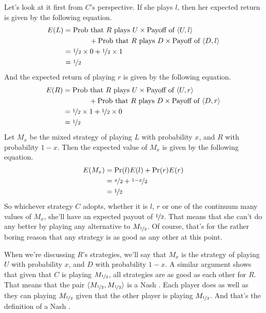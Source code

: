 Let's look at it first from $C$'s perspective. If she plays $l$, then her expected return is given by the following equation.
\begin{align*}
E(L) &= \text{Prob that } R \text{ plays $U$} \times \text{Payoff of }\langle U, l \rangle \\
& \hspace{36pt} + \text{Prob that } R \text{ plays $D$} \times \text{Payoff of }\langle D, l \rangle \\
&= \nicefrac{1}{2} \times 0 + \nicefrac{1}{2} \times 1 \\
&= \nicefrac{1}{2}
\end{align*}
\noindent And the expected return of playing $r$ is given by the following equation.
\begin{align*}
E(R) &= \text{Prob that } R \text{ plays $U$} \times \text{Payoff of }\langle U, r \rangle \\
& \hspace{36pt} + \text{Prob that } R \text{ plays $D$} \times \text{Payoff of }\langle D, r \rangle \\
&= \nicefrac{1}{2} \times 1 + \nicefrac{1}{2} \times 0 \\
&= \nicefrac{1}{2}
\end{align*}
\noindent Let $M_x$ be the mixed strategy of playing $L$ with probability $x$, and $R$ with probability $1-x$. Then the expected value of $M_x$ is given by the following equation.
\begin{align*}
E(M_x) &= \Pr(l)E(l) + \Pr(r)E(r) \\
 &= \nicefrac{x}{2} + \nicefrac{1-x}{2} \\
&= \nicefrac{1}{2}
\end{align*}
\noindent So whichever strategy $C$ adopts, whether it is $l$, $r$ or one of the continuum many values of $M_x$, she'll have an expected payout of $\nicefrac{1}{2}$. That means that she can't do any better by playing any alternative to $M_{\nicefrac{1}{2}}$. Of course, that's for the rather boring reason that any strategy is as good as any other at this point.

When we're discussing $R$'s strategies, we'll say that $M_x$ is the strategy of playing $U$ with probability $x$, and $D$ with probability $1-x$. A similar argument shows that given that $C$ is playing $M_{\nicefrac{1}{2}}$, all strategies are as good as each other for $R$. That means that the pair $\langle M_{\nicefrac{1}{2}}, M_{\nicefrac{1}{2}} \rangle$ is a Nash \Eqm. Each player does as well as they can playing $M_{\nicefrac{1}{2}}$ given that the other player is playing $M_{\nicefrac{1}{2}}$. And that's the definition of a Nash \Eqm.

